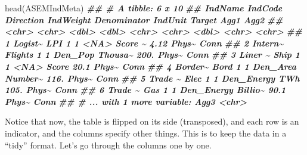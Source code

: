 \documentclass[
]{book}
\newenvironment{Shaded}{\begin{snugshade}}{\end{snugshade}}
\newcommand{\DocumentationTok}[1]{\textcolor[rgb]{0.56,0.35,0.01}{\textbf{\textit{#1}}}}
\newcommand{\FunctionTok}[1]{\textcolor[rgb]{0.00,0.00,0.00}{#1}}
\newcommand{\NormalTok}[1]{#1}
\begin{document}
\begin{Shaded}
\begin{Highlighting}[]
\FunctionTok{head}\NormalTok{(ASEMIndMeta)}
\DocumentationTok{\#\# \# A tibble: 6 x 10}
\DocumentationTok{\#\#   IndName IndCode Direction IndWeight Denominator IndUnit Target Agg1  Agg2 }
\DocumentationTok{\#\#   \textless{}chr\textgreater{}   \textless{}chr\textgreater{}       \textless{}dbl\textgreater{}     \textless{}dbl\textgreater{} \textless{}chr\textgreater{}       \textless{}chr\textgreater{}    \textless{}dbl\textgreater{} \textless{}chr\textgreater{} \textless{}chr\textgreater{}}
\DocumentationTok{\#\# 1 Logist\textasciitilde{} LPI             1         1 \textless{}NA\textgreater{}        Score \textasciitilde{}   4.12 Phys\textasciitilde{} Conn }
\DocumentationTok{\#\# 2 Intern\textasciitilde{} Flights         1         1 Den\_Pop     Thousa\textasciitilde{} 200.   Phys\textasciitilde{} Conn }
\DocumentationTok{\#\# 3 Liner \textasciitilde{} Ship            1         1 \textless{}NA\textgreater{}        Score    20.1  Phys\textasciitilde{} Conn }
\DocumentationTok{\#\# 4 Border\textasciitilde{} Bord            1         1 Den\_Area    Number\textasciitilde{} 116.   Phys\textasciitilde{} Conn }
\DocumentationTok{\#\# 5 Trade \textasciitilde{} Elec            1         1 Den\_Energy  TWh     105.   Phys\textasciitilde{} Conn }
\DocumentationTok{\#\# 6 Trade \textasciitilde{} Gas             1         1 Den\_Energy  Billio\textasciitilde{}  90.1  Phys\textasciitilde{} Conn }
\DocumentationTok{\#\# \# ... with 1 more variable: Agg3 \textless{}chr\textgreater{}}
\end{Highlighting}
\end{Shaded}

Notice that now, the table is flipped on its side (transposed), and each row is an indicator, and the columns specify other things. This is to keep the data in a ``tidy'' format. Let's go through the columns one by one.
\end{document}

